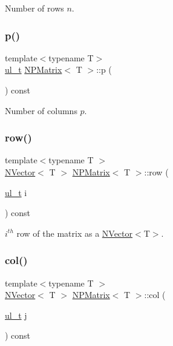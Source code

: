 Number of rows $ n $. 

\mbox{\label{class_n_p_matrix_a3beee8acb5babf62d2b4f212ac5d18e8}} 
\subsubsection{\texorpdfstring{p()}{p()}}
{\footnotesize\ttfamily template$<$typename T$>$ \\
\mbox{\hyperlink{typedef_8h_a1b140a2034db3f5dfe18a987745df43a}{ul\+\_\+t}} \mbox{\hyperlink{class_n_p_matrix}{N\+P\+Matrix}}$<$ T $>$\+::p (\begin{DoxyParamCaption}{ }\end{DoxyParamCaption}) const\hspace{0.3cm}{\ttfamily [inline]}}



Number of columns $ p $. 

\mbox{\label{class_n_p_matrix_a99ae2d8850ecdb33fbd9a71804ab4ea7}} 
\subsubsection{\texorpdfstring{row()}{row()}}
{\footnotesize\ttfamily template$<$typename T $>$ \\
\mbox{\hyperlink{class_n_vector}{N\+Vector}}$<$ T $>$ \mbox{\hyperlink{class_n_p_matrix}{N\+P\+Matrix}}$<$ T $>$\+::row (\begin{DoxyParamCaption}\item[{\mbox{\hyperlink{typedef_8h_a1b140a2034db3f5dfe18a987745df43a}{ul\+\_\+t}}}]{i }\end{DoxyParamCaption}) const}



$ i^{th} $ row of the matrix as a {\ttfamily \mbox{\hyperlink{class_n_vector}{N\+Vector}}$<$T$>$}. 

\mbox{\label{class_n_p_matrix_aa137db97da518f1dfb69e7eb8fa1b94d}} 
\subsubsection{\texorpdfstring{col()}{col()}}
{\footnotesize\ttfamily template$<$typename T $>$ \\
\mbox{\hyperlink{class_n_vector}{N\+Vector}}$<$ T $>$ \mbox{\hyperlink{class_n_p_matrix}{N\+P\+Matrix}}$<$ T $>$\+::col (\begin{DoxyParamCaption}\item[{\mbox{\hyperlink{typedef_8h_a1b140a2034db3f5dfe18a987745df43a}{ul\+\_\+t}}}]{j }\end{DoxyParamCaption}) const}



